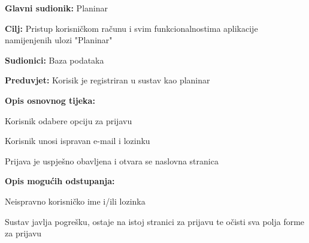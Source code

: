 			\noindent {}
		\begin{packed_item}
			
			\item \textbf{Glavni sudionik: }$ $Planinar$ $
			\item  \textbf{Cilj:} $ $Pristup korisničkom računu i svim funkcionalnostima aplikacije namijenjenih ulozi "Planinar"$ $
			\item  \textbf{Sudionici:} $ $Baza podataka$ $
			\item  \textbf{Preduvjet:} $ $Korisik je registriran u sustav kao planinar$ $
			\item  \textbf{Opis osnovnog tijeka:}
			
			\item[] \begin{packed_enum}
				
				\item $ $Korisnik odabere opciju za prijavu$ $
				\item $ $Korisnik unosi ispravan e-mail i lozinku$ $
				\item $ $Prijava je uspješno obavljena i otvara se naslovna stranica$ $
				
			\end{packed_enum}
			
			\item  \textbf{Opis mogućih odstupanja:}
			
			\item[] \begin{packed_item}
				
				\item[3.a] $ $Neispravno korisničko ime i/ili lozinka $ $
				\item[] \begin{packed_enum}
					
					\item $ $Sustav javlja pogrešku, ostaje na istoj stranici za prijavu te očisti sva polja forme za prijavu$ $
				\end{packed_enum}
			\end{packed_item}
		\end{packed_item}
		
